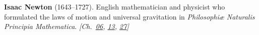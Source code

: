 \textbf{Isaac Newton} (1643–1727). English mathematician and physicist who formulated the laws of motion and universal gravitation in \emph{Philosophi\ae{} Naturalis Principia Mathematica}. \emph{[Ch.~\hyperref[ch:gravitytimedilation]{06}, \hyperref[ch:poissonsspot]{13}, \hyperref[ch:planetaryskycolors]{27}]}

